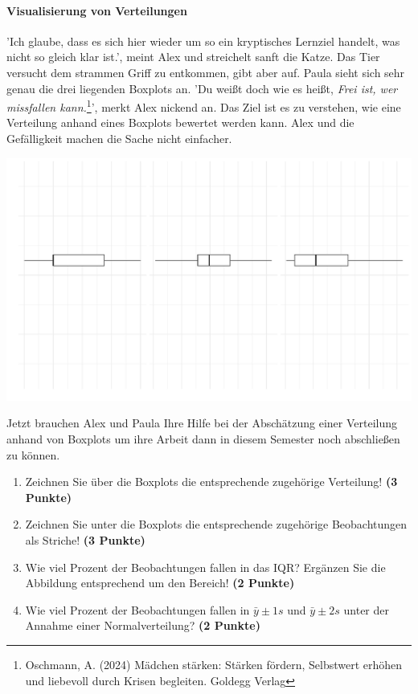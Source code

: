 \documentclass[a4paper, 9pt]{scrartcl}\usepackage[]{graphicx}\usepackage[]{xcolor}
\makeatletter
\def\maxwidth{ %
  \ifdim\Gin@nat@width>\linewidth
    \linewidth
  \else
    \Gin@nat@width
  \fi
}
\makeatother
\begin{document}
\ifcollection
\paragraph{Visualisierung von Verteilungen}
\fi

'Ich glaube, dass es sich hier wieder um so ein kryptisches Lernziel handelt, was nicht so gleich klar ist.', meint Alex und streichelt sanft die Katze. Das Tier versucht dem strammen Griff zu entkommen, gibt aber auf. Paula sieht sich sehr genau die drei liegenden Boxplots an. 'Du weißt doch wie es heißt, \textit{Frei ist, wer missfallen kann.}\footnote{Oschmann, A. (2024) Mädchen stärken: Stärken fördern, Selbstwert erhöhen und liebevoll durch Krisen begleiten. Goldegg Verlag}', merkt Alex nickend an. Das Ziel ist es zu verstehen, wie eine Verteilung anhand eines Boxplots bewertet werden kann. Alex und die Gefälligkeit machen die Sache nicht einfacher.



{\centering \includegraphics[width=\maxwidth]{img/desc-stat-11-1} 

}




Jetzt brauchen Alex und Paula Ihre Hilfe bei der Abschätzung einer Verteilung anhand von Boxplots um ihre Arbeit dann in diesem Semester noch abschließen zu können.

\begin{enumerate}
\item Zeichnen Sie über die Boxplots die entsprechende zugehörige Verteilung! \textbf{(3 Punkte)} 
\item Zeichnen Sie unter die Boxplots die entsprechende zugehörige Beobachtungen als Striche! \textbf{(3 Punkte)}
\item Wie viel Prozent der Beobachtungen fallen in das IQR? Ergänzen Sie die Abbildung entsprechend um den Bereich! \textbf{(2 Punkte)}
\item Wie viel Prozent der Beobachtungen fallen in $\bar{y} \pm 1s$ und $\bar{y} \pm 2s$  unter der Annahme einer Normalverteilung? \textbf{(2 Punkte)}
\end{enumerate} 
\clearpage
\end{document}
